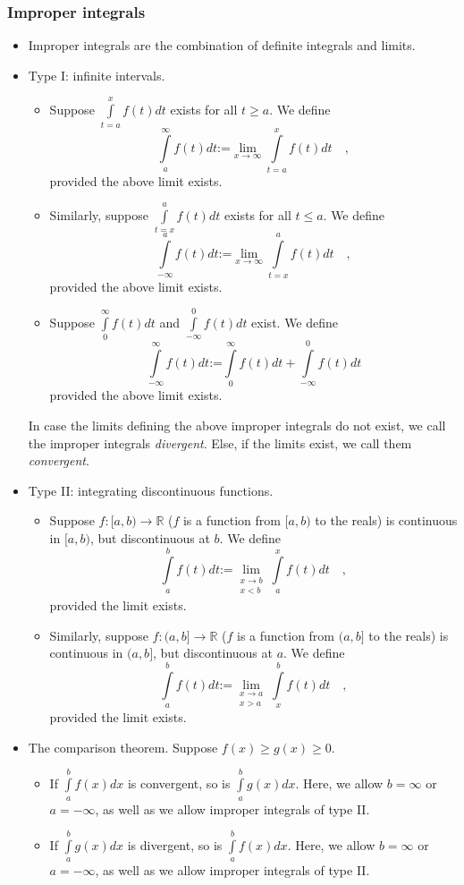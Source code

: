 \documentclass[12pt]{book}
\newcommand{\eqdef}{\textbf{:=}}
\begin{document}
\subsubsection{Improper integrals}\label{secImproperIntegrals}
\begin{itemize} 
\item {} Improper integrals are the combination of definite integrals and limits.
\item Type I: infinite intervals.

\begin{itemize}
\item Suppose $\int\limits_{t=a}^{x}f(t)dt$ exists for all $t\geq a$. We define 
\[
\int\limits_{a}^{\infty} f(t)dt\eqdef  \lim
\limits_{x\to \infty}\int\limits_{t=a}^{x}f(t)dt\quad,
\]
provided the above limit exists.
\item Similarly, suppose $\int\limits_{t=x}^{a}f(t)dt$ exists for all $t\leq a$. We define 
\[
\int\limits_{-\infty}^{a} f(t)dt\eqdef  \lim
\limits_{x\to \infty}\int\limits_{t=x}^{a}f(t)dt\quad,
\]
provided the above limit exists.
\item Suppose $\int\limits_{0}^{\infty}f(t)dt$ and $\int\limits_{-\infty}^{0}f(t)dt$  exist. We define
\[
\int\limits_{-\infty}^{\infty} f(t)dt\eqdef  \int\limits_{0}^{\infty}f(t)dt+\int\limits_{-\infty}^{0}f(t)dt
\]
provided the above limit exists.
\end{itemize}
In case the limits defining the above improper integrals do not exist, we call the improper integrals \emph{divergent}. Else, if the limits exist, we call them \emph{convergent}.  
\item Type II: integrating discontinuous functions.
\begin{itemize}
\item Suppose $f:[a,b)\to \mathbb R$ ($f$ is a function from $[a,b)$ to the reals) is continuous in $[a,b)$, but discontinuous at $b$. We define 
\[
\int\limits_{a}^{b}f(t)dt\eqdef \lim\limits_{\substack{x\to b \\ x<b}}\int\limits_{a}^{x} f(t)dt\quad , 
\]
provided the limit exists.
\item Similarly, suppose $f:(a,b]\to \mathbb R$ ($f$ is a function from $(a,b]$ to the reals) is continuous in $(a,b]$, but discontinuous at $a$. We define 
\[
\int\limits_{a}^{b}f(t)dt\eqdef \lim\limits_{\substack{x\to a \\ x>a}}\int\limits_{x}^{b} f(t)dt\quad , 
\]
provided the limit exists.
\end{itemize}
\item The comparison theorem. Suppose $f(x)\geq g(x)\geq 0$.
\begin{itemize}
\item If $\int\limits_{a}^{b}f(x)dx$ is convergent, so is $\int\limits_{a}^{b}g(x)dx$. Here, we allow $ b=\infty$ or $a=-\infty$, as well as we allow improper integrals of type II.
\item If $\int\limits_{a}^{b}g(x)dx$ is divergent, so is $\int\limits_{a}^{b}f(x)dx$. Here, we allow $ b=\infty$ or $a=-\infty$, as well as we allow improper integrals of type II.
\end{itemize}
\end{itemize}
\end{document}
